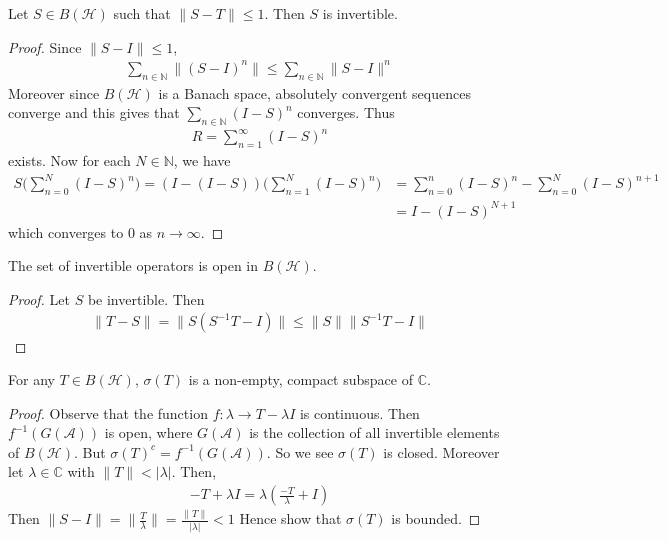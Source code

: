 \begin{lemma}
  Let $S \in B(\mathcal{H})$ such that $\|S - T\| \le 1$. Then $S$ is
  invertible.
\end{lemma}
\begin{proof}
  Since $\|S  -I\| \le 1$,
  \begin{align*}
    \sum_{n \in \mathbb{N}} \|(S-I)^n\| \le \sum_{n \in \mathbb{N}} \|S - I\|^n
  \end{align*}
  Moreover since $B(\mathcal{H})$ is a Banach space, absolutely
  convergent sequences converge and this gives that
  $\sum_{n \in \mathbb{N}} (I - S)^n$ converges. Thus
  \begin{align*}
    R = \sum_{n=1}^\infty (I - S)^n
  \end{align*}
  exists. Now for each $N \in \mathbb{N}$, we have
  \begin{align*}
    S \Big(\sum_{n = 0}^{N} (I - S)^n\Big) = (I - (I -
    S))\Big(\sum_{n = 1}^{N} (I - S)^n\Big) &= \sum_{n = 0}^{n} (I -
    S)^n - \sum_{n = 0}^{N} (I-S)^{n+1}\\
    &= I - (I-S)^{N+1}
  \end{align*}
  which converges to $0$ as $n \to \infty$.
\end{proof}

\begin{corollary}
  The set of invertible operators is open in $B(\mathcal{H})$.
\end{corollary}
\begin{proof}
  Let $S$ be invertible. Then
  \begin{align*}
    \|T - S\| = \|S(S^{-1}T - I)\| \le \| S\| \|S^{-1}T - I\|
  \end{align*}
\end{proof}

\begin{theorem}
  For any $T \in B(\mathcal{H})$, $\sigma(T)$ is a non-empty, compact
  subspace of $\mathbb{C}$.
\end{theorem}
\begin{proof}
  Observe that the function $f: \lambda \to T - \lambda I$ is
  continuous. Then $f^{-1}(G(\mathcal{A}))$ is open, where
  $G(\mathcal{A})$ is the collection of all invertible elements of
  $B(\mathcal{H})$. But $\sigma(T)^{c} = f^{-1}(G(\mathcal{A}))$.
  So we see $\sigma(T)$ is closed. Moreover let $\lambda \in
  \mathbb{C}$ with $\|T\| < |\lambda|$. Then,
  \begin{align*}
    -T + \lambda I = \lambda(\frac{-T}{\lambda} + I)
  \end{align*}
  Then $\|S - I\| = \| \frac{T}{\lambda}\| = \frac{\|T\|}{|\lambda|} < 1$
  Hence show that $\sigma(T)$ is bounded.
\end{proof}
